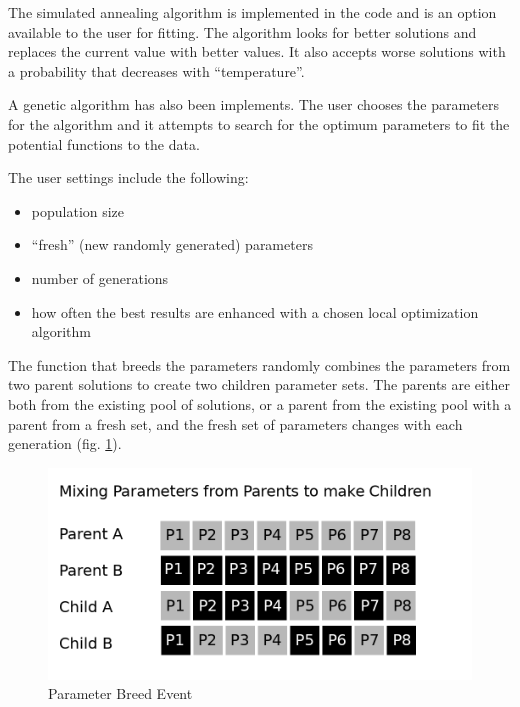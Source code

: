 The simulated annealing algorithm is implemented in the code and is an option available to the user for fitting.  The algorithm looks for better solutions and replaces the current value with better values.  It also accepts worse solutions with a probability that decreases with \enquote{temperature}.  

A genetic algorithm has also been implements.  The user chooses the parameters for the algorithm and it attempts to search for the optimum parameters to fit the potential functions to the data.

The user settings include the following:

\begin{itemize}
\item population size
\item \enquote{fresh} (new randomly generated) parameters
\item number of generations
\item how often the best results are enhanced with a chosen local optimization algorithm
\end{itemize}

The function that breeds the parameters randomly combines the parameters from two parent solutions to create two children parameter sets.  The parents are either both from the existing pool of solutions, or a parent from the existing pool with a parent from a fresh set, and the fresh set of parameters changes with each generation (fig. \ref{fig:gabreedevent}).

\begin{figure}[h]
  \begin{center}
    \includegraphics[scale=0.30]{chapters/potentials_fe_pd_ru/images/breeding.png}
    \caption{Parameter Breed Event}
    \label{fig:gabreedevent}
  \end{center}
\end{figure}

